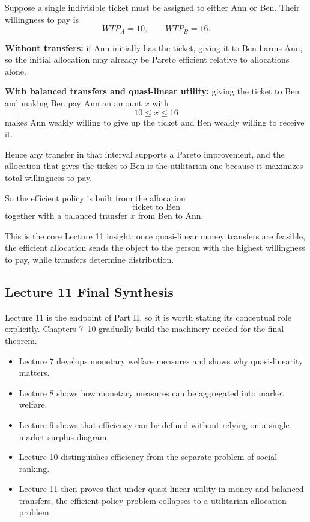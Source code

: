 \begin{examplebox}[title={Worked Review Example 5: Utilitarian allocation with balanced transfers}]
Suppose a single indivisible ticket must be assigned to either Ann or Ben. Their willingness to pay is
\[
WTP_A=10,
\qquad
WTP_B=16.
\]

\textbf{Without transfers:} if Ann initially has the ticket, giving it to Ben harms Ann, so the initial allocation may already be Pareto efficient relative to allocations alone.

\textbf{With balanced transfers and quasi-linear utility:} giving the ticket to Ben and making Ben pay Ann an amount \(x\) with
\[
10 \le x \le 16
\]
makes Ann weakly willing to give up the ticket and Ben weakly willing to receive it.

Hence any transfer in that interval supports a Pareto improvement, and the allocation that gives the ticket to Ben is the utilitarian one because it maximizes total willingness to pay.

So the efficient policy is built from the allocation
\[
\boxed{\text{ticket to Ben}}
\]
together with a balanced transfer \(x\) from Ben to Ann.

This is the core Lecture 11 insight: once quasi-linear money transfers are feasible, the efficient allocation sends the object to the person with the highest willingness to pay, while transfers determine distribution.
\end{examplebox}

\subsection{Lecture 11 Final Synthesis}

Lecture 11 is the endpoint of Part II, so it is worth stating its conceptual role explicitly. Chapters 7--10 gradually build the machinery needed for the final theorem.

\begin{itemize}
    \item Lecture 7 develops monetary welfare measures and shows why quasi-linearity matters.
    \item Lecture 8 shows how monetary measures can be aggregated into market welfare.
    \item Lecture 9 shows that efficiency can be defined without relying on a single-market surplus diagram.
    \item Lecture 10 distinguishes efficiency from the separate problem of social ranking.
    \item Lecture 11 then proves that under quasi-linear utility in money and balanced transfers, the efficient policy problem collapses to a utilitarian allocation problem.
\end{itemize}

